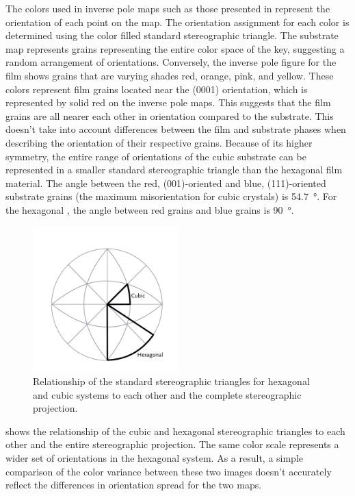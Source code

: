 The colors used in inverse pole maps such as those presented in 
represent the orientation of each point on the map. The orientation assignment for each
color is determined using the color filled standard stereographic triangle. The substrate
map represents grains representing the entire color space of the key, suggesting a random
arrangement of orientations. Conversely, the inverse pole figure for the film shows grains
that are varying shades red, orange, pink, and yellow. These colors represent film grains
located near the (0001) orientation, which is represented by solid red on the inverse pole
maps. This suggests that the film grains are all nearer each other in orientation compared
to the substrate. This doesn't take into account differences between the film and
substrate phases when describing the orientation of their respective grains. Because of
its higher symmetry, the entire range of orientations of the cubic substrate can be
represented in a smaller standard stereographic triangle than the hexagonal film material.
The angle between the red, (001)-oriented and blue, (111)-oriented substrate grains (the
maximum misorientation for cubic crystals) is \SI{54.7}{\degree}. For the hexagonal \feo,
the angle between red grains and blue grains is \SI{90}{\degree}. 
\begin{figure}
	\begin{center}
	\includegraphics[width=0.5\textwidth]{stereotriangles.pdf}
		\caption[Relationship of stereographic triangles]{%
			Relationship of the standard stereographic triangles for hexagonal
			and cubic systems to each other and the complete stereographic 
			projection.}
	\label{fig:stereotriangles}
	\end{center}
\end{figure}
 shows the relationship of the cubic and hexagonal
stereographic triangles to each other and the entire stereographic projection. The same
color scale represents a wider set of orientations in the hexagonal system. As a result, a
simple comparison of the color variance between these two images doesn't accurately
reflect the differences in orientation spread for the two maps.


